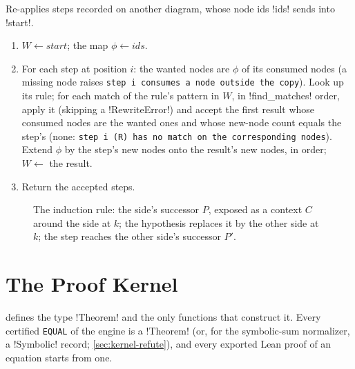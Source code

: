 \begin{algorithm}\label{alg:kernel-transport}
Re-applies steps recorded on another diagram, whose node ids \code!ids! sends into \code!start!.
\begin{enumerate}
\item $W\gets\textit{start}$; the map $\phi\gets\textit{ids}$.
\item For each step at position $i$: the wanted nodes are $\phi$ of its consumed nodes (a missing node raises \texttt{step i consumes a node outside the copy}). Look up its rule; for each match of the rule's pattern in $W$, in \py!find_matches! order, apply it (skipping a \py!RewriteError!) and accept the first result whose consumed nodes are the wanted ones and whose new-node count equals the step's (none: \texttt{step i (\allowbreak{}R) has no match on the corresponding nodes}). Extend $\phi$ by the step's new nodes onto the result's new nodes, in order; $W\gets$ the result.
\item Return the accepted steps.
\end{enumerate}
\end{algorithm}

\begin{figure}[H]
\centering
{}
\caption{The induction rule: the side's successor $P$, exposed as a context $C$ around the side at $k$; the hypothesis replaces it by the other side at $k$; the step reaches the other side's successor $P'$.}\label{fig:kernel-induction}
\end{figure}

\section{The Proof Kernel}\label{sec:kernel-kernel}

 defines the type \py!Theorem! and the only functions that construct it. Every certified \texttt{EQUAL} of the engine is a \py!Theorem! (or, for the symbolic-sum normalizer, a \py!Symbolic! record; \cref{sec:kernel-refute}), and every exported Lean proof of an equation starts from one.

